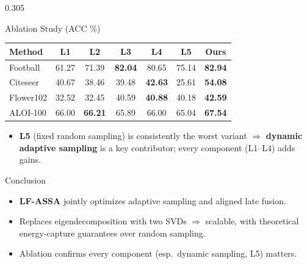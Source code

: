 \documentclass[final,t]{beamer}
\begin{document}
\begin{frame}[t]
\begin{columns}[t]
\begin{column}{0.305\paperwidth}
\begin{block}{Ablation Study (ACC \%)}
\centering
{\fontsize{19}{24}\selectfont
\renewcommand{\arraystretch}{1.3}
\begin{tabular}{lcccccc}
\toprule
\textbf{Method} & \textbf{L1} & \textbf{L2} & \textbf{L3} & \textbf{L4} & \textbf{L5} & \textbf{Ours} \\
\midrule
Football   & 61.27 & 71.39 & \textcolor{acmblue}{\textbf{82.04}} & 80.65 & 75.14 & \textcolor{acmred}{\textbf{82.94}} \\
Citeseer   & 40.67 & 38.46 & 39.48 & \textcolor{acmblue}{\textbf{42.63}} & 25.61 & \textcolor{acmred}{\textbf{54.08}} \\
Flower102  & 32.52 & 32.45 & 40.59 & \textcolor{acmblue}{\textbf{40.88}} & 40.18 & \textcolor{acmred}{\textbf{42.59}} \\
ALOI-100   & 66.00 & \textcolor{acmblue}{\textbf{66.21}} & 65.89 & 66.00 & 65.04 & \textcolor{acmred}{\textbf{67.54}} \\
\bottomrule
\end{tabular}\par}
\vspace{0.2cm}
\begin{itemize}
  \item \textbf{L5} (fixed random sampling) is consistently the worst variant
        $\Rightarrow$ \textbf{dynamic adaptive sampling} is a key contributor;
        every component (L1--L4) adds gains.
\end{itemize}
\end{block}

\begin{alertblock}{Conclusion}
\begin{itemize}
  \item \textbf{LF-ASSA} jointly optimizes adaptive sampling and aligned late
        fusion.
  \item Replaces eigendecomposition with two SVDs $\Rightarrow$ scalable, with
        theoretical energy-capture guarantees over random sampling.
  \item Ablation confirms every component (esp.\ dynamic sampling, L5) matters.
\end{itemize}
\end{alertblock}

\end{column}

\end{columns}
\end{frame}
\end{document}
